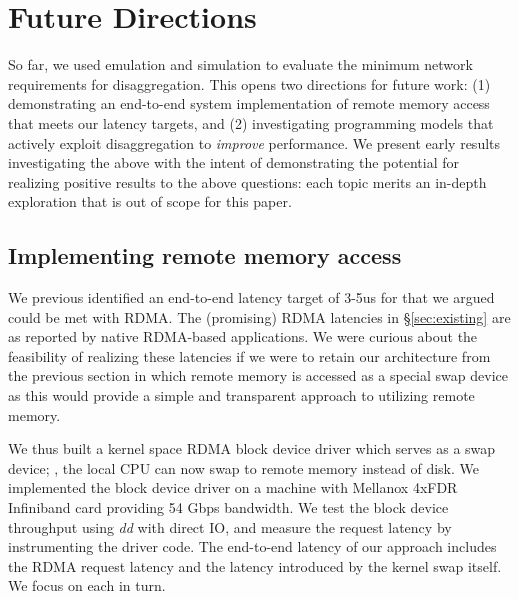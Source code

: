 \vspace{-0.1in}
\section{Future Directions}
\label{sec:future}
\vspace{-0.05in}

So far, we used emulation and simulation to evaluate the minimum network requirements for  disaggregation.%
This opens two directions for future work: (1) demonstrating an end-to-end system implementation of remote memory access that meets our latency targets, and (2) investigating programming models that actively exploit disaggregation to \emph{improve} performance.
We present early results investigating the above with the intent of demonstrating the potential for realizing positive results to the above questions: each topic merits an in-depth exploration that is out of scope for this paper.


\vspace{-0.1in}
\subsection{Implementing remote memory access}
\vspace{-0.05in}
We previous identified an end-to-end latency target of 3-5us for \dis that we argued could be met with RDMA. The (promising) RDMA latencies in \S\ref{sec:existing} are as reported by native RDMA-based applications. 
We were curious about the feasibility of realizing these latencies if we were to retain our 
architecture from the previous section in which remote memory is accessed as a special swap device as this would provide a simple and transparent approach to utilizing remote memory. 

We thus built a kernel space RDMA block device driver which serves as a swap device; \ie, the local CPU can now swap to remote memory instead of disk.
We implemented the block device driver on a machine with Mellanox 4xFDR Infiniband card providing 54 Gbps bandwidth.
We test the block device throughput using \textit{dd} with direct IO, and measure the request latency by instrumenting the driver code. 
The end-to-end latency of our approach includes the RDMA request latency and the latency introduced by the kernel swap itself. We focus on each in turn. 

